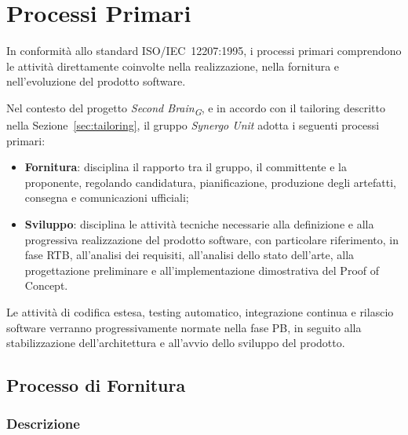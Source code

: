 
\section{Processi Primari}
\label{sec:processi-primari}

In conformità allo standard ISO/IEC~12207:1995, i processi primari
comprendono le attività direttamente coinvolte nella realizzazione, nella fornitura
e nell'evoluzione del prodotto software.

Nel contesto del progetto \textit{Second Brain\textsubscript{G}}, e in accordo con il tailoring
descritto nella Sezione~\ref{sec:tailoring}, il gruppo \textit{Synergo Unit} adotta
i seguenti processi primari:

\begin{itemize}
    \item \textbf{Fornitura}: disciplina il rapporto tra il gruppo, il committente e
    la proponente, regolando candidatura, pianificazione, produzione degli
    artefatti, consegna e comunicazioni ufficiali;

    \item \textbf{Sviluppo}: disciplina le attività tecniche necessarie alla
    definizione e alla progressiva realizzazione del prodotto software, con
    particolare riferimento, in fase RTB, all'analisi dei requisiti,
    all'analisi dello stato dell'arte, alla progettazione preliminare e all'implementazione dimostrativa del Proof of Concept.
\end{itemize}

Le attività di codifica estesa, testing automatico, integrazione continua e
rilascio software verranno progressivamente normate nella fase PB,
in seguito alla stabilizzazione dell'architettura e all'avvio dello sviluppo
del prodotto.


\subsection{Processo di Fornitura}
\label{sec:fornitura}

\subsubsection{Descrizione}

